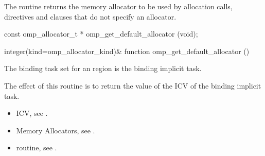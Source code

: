 \summary
The  routine returns the memory allocator to be used by allocation calls,  directives and  clauses that do not specify an allocator.

\format
\begin{ccppspecific}
\begin{ompcFunction}
const omp_allocator_t * omp_get_default_allocator (void);
\end{ompcFunction}
\end{ccppspecific}
\begin{fortranspecific}
\begin{ompfFunction}
integer(kind=omp_allocator_kind)&
function omp_get_default_allocator ()
\end{ompfFunction}
\end{fortranspecific}

\binding

The binding task set for an  region is the binding implicit task.

\effect

The effect of this routine is to return the value of the  ICV of the binding implicit task.

\crossreferences
\begin{itemize}
\item {} ICV, see .
\item Memory Allocators, see .
\item {} routine, see .
\end{itemize}


